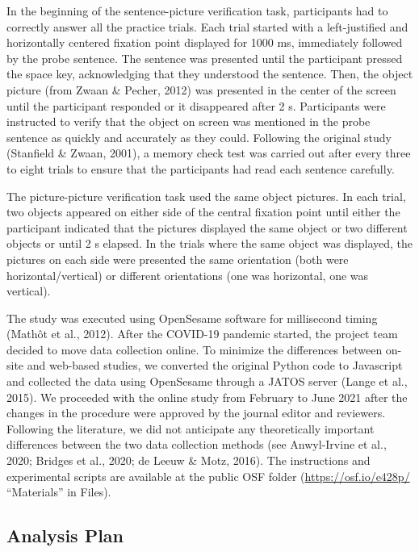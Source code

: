 \documentclass[
  man]{apa7}
\begin{document}
In the beginning of the sentence-picture verification task, participants had to correctly answer all the practice trials. Each trial started with a left-justified and horizontally centered fixation point displayed for 1000 ms, immediately followed by the probe sentence. The sentence was presented until the participant pressed the space key, acknowledging that they understood the sentence. Then, the object picture (from Zwaan \& Pecher, 2012) was presented in the center of the screen until the participant responded or it disappeared after 2 s. Participants were instructed to verify that the object on screen was mentioned in the probe sentence as quickly and accurately as they could. Following the original study (Stanfield \& Zwaan, 2001), a memory check test was carried out after every three to eight trials to ensure that the participants had read each sentence carefully.

The picture-picture verification task used the same object pictures. In each trial, two objects appeared on either side of the central fixation point until either the participant indicated that the pictures displayed the same object or two different objects or until 2 s elapsed. In the trials where the same object was displayed, the pictures on each side were presented the same orientation (both were horizontal/vertical) or different orientations (one was horizontal, one was vertical).

The study was executed using OpenSesame software for millisecond timing (Mathôt et al., 2012). After the COVID-19 pandemic started, the project team decided to move data collection online. To minimize the differences between on-site and web-based studies, we converted the original Python code to Javascript and collected the data using OpenSesame through a JATOS server (Lange et al., 2015). We proceeded with the online study from February to June 2021 after the changes in the procedure were approved by the journal editor and reviewers. Following the literature, we did not anticipate any theoretically important differences between the two data collection methods (see Anwyl-Irvine et al., 2020; Bridges et al., 2020; de Leeuw \& Motz, 2016). The instructions and experimental scripts are available at the public OSF folder (\url{https://osf.io/e428p/} ``Materials'' in Files).

\hypertarget{analysis-plan}{%
\subsection{Analysis Plan}\label{analysis-plan}}
\end{document}
